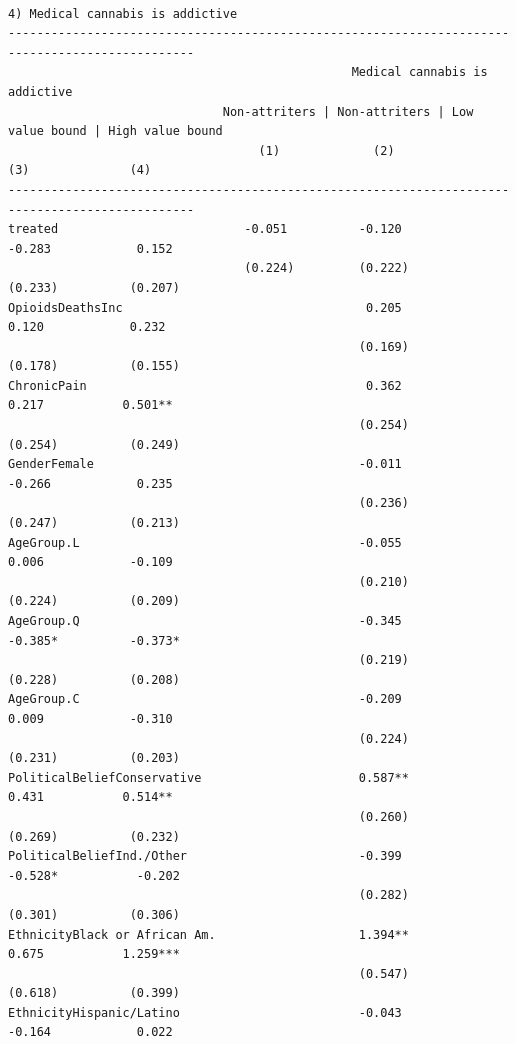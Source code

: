 \documentclass[
]{article}
\begin{document}
\begin{verbatim}

4) Medical cannabis is addictive
------------------------------------------------------------------------------------------------
                                                Medical cannabis is addictive                   
                              Non-attriters | Non-attriters | Low value bound | High value bound
                                   (1)             (2)              (3)              (4)        
------------------------------------------------------------------------------------------------
treated                          -0.051          -0.120           -0.283            0.152       
                                 (0.224)         (0.222)          (0.233)          (0.207)      
OpioidsDeathsInc                                  0.205            0.120            0.232       
                                                 (0.169)          (0.178)          (0.155)      
ChronicPain                                       0.362            0.217           0.501**      
                                                 (0.254)          (0.254)          (0.249)      
GenderFemale                                     -0.011           -0.266            0.235       
                                                 (0.236)          (0.247)          (0.213)      
AgeGroup.L                                       -0.055            0.006            -0.109      
                                                 (0.210)          (0.224)          (0.209)      
AgeGroup.Q                                       -0.345           -0.385*          -0.373*      
                                                 (0.219)          (0.228)          (0.208)      
AgeGroup.C                                       -0.209            0.009            -0.310      
                                                 (0.224)          (0.231)          (0.203)      
PoliticalBeliefConservative                      0.587**           0.431           0.514**      
                                                 (0.260)          (0.269)          (0.232)      
PoliticalBeliefInd./Other                        -0.399           -0.528*           -0.202      
                                                 (0.282)          (0.301)          (0.306)      
EthnicityBlack or African Am.                    1.394**           0.675           1.259***     
                                                 (0.547)          (0.618)          (0.399)      
EthnicityHispanic/Latino                         -0.043           -0.164            0.022       

\end{verbatim}
\end{document}

